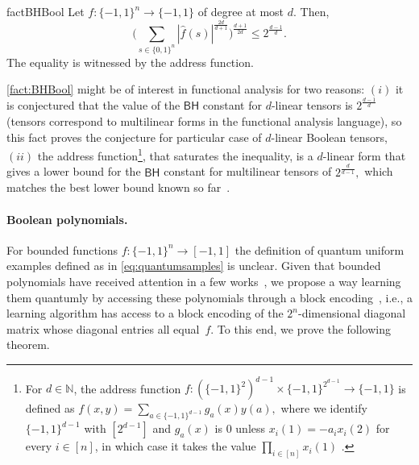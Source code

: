 \documentclass[11pt]{article}
\newcommand{\BH}{\textsf{BH}}
\theoremstyle{plain}
\theoremstyle{plain}
\theoremstyle{definition}
\theoremstyle{remark}
\theoremstyle{named}
\begin{document}
\begin{restatable}{fact}{BHBool}\label{fact:BHBool}
    Let $f:\{-1,1\}^n\to\{-1,1\}$ of degree at most $d$. Then, 
    $$
    \Big(\sum_{s\in\{0,1\}^n}|\widehat f(s)|^{\frac{2d}{d+1}}\Big)^{\frac{d+1}{2d}}\leq  2^{\frac{d-1}{d}}.$$
    The equality is witnessed by the address function.     
\end{restatable}
\cref{fact:BHBool} might be of interest in functional analysis for two reasons: $(i)$ it is conjectured that the value of the $\BH$ constant for $d$-linear tensors is $2^{\frac{d-1}{d}}$~\cite{pellegrino2018towards} (tensors correspond to multilinear forms in the functional analysis language), so this fact proves the conjecture for particular case of $d$-linear Boolean tensors, 
$(ii)$ the address function\footnote{ For $d\in\mathbb N$, the address function $f:(\{-1,1\}^2)^{d-1}\times\{-1,1\}^{2^{d-1}}\to \{-1,1\}$ is defined as 
    $f(x,y)=\sum_{a\in \{-1,1\}^{d-1}}g_a(x)y(a),$
    where we identify $\{-1,1\}^{d-1}$ with $[2^{d-1}]$ and $g_a(x)$ is $0$ unless $x_i(1)=-a_ix_i(2)$ for every $i\in [n]$, in which case it takes the value $\prod_{i\in [n]} x_i(1)$ .}, that saturates the inequality, is a $d$-linear form that gives a lower bound for the $\BH$ constant for multilinear tensors of $2^{\frac{d}{d-1}},$ which matches the best lower bound known so far~\cite{diniz2014lower}. 


\paragraph{Boolean polynomials.} For bounded functions $f:\{-1,1\}^n\to [-1,1]$ the definition of quantum uniform examples defined as in \cref{eq:quantumsamples} is unclear. Given that bounded polynomials have received attention in a few works~\cite{linial1993constant,iyer2021tight,eskenazis2022learning}, we propose a way learning them quantumly by accessing these polynomials through a block encoding~\cite{chakraborty2018power}, i.e., a learning algorithm has access to a block encoding of the $2^n$-dimensional diagonal matrix whose diagonal entries all equal~$f$. To this end, we prove the following theorem. 
\end{document}
